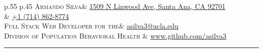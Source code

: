\documentclass{tccv}
\begin{document}
\begin{table}[htbp]
\begin{tabular}{ 
	p{}%
	p{}%
 }
	{\scshape\fontsize{20}{26}\mdseries\upshape Armando Silva}& \centering\arraybackslash \href{https://www.google.com/maps/place/1509+N+Linwood+Ave,+Santa+Ana,+CA+92701/@33.758298,-117.8506497,17z/data=!3m1!4b1!4m5!3m4!1s0x80dcd99c21dd18dd:0x4fe5fb4a40877585!8m2!3d33.758298!4d-117.848461}{1509 N Linwood Ave, Santa Ana, CA 92701} \\ 
	& \centering\arraybackslash \href{tel:17148628774}{+1 (714) 862-8774}        \\ 

	{\scshape\fontsize{10}{10}\mdseries\upshape Full Stack Web Developer for the}& \centering\arraybackslash \href{mailto:asilva3@ucla.edu}{asilva3@ucla.edu}         \\ 
	{\scshape\fontsize{10}{10}\mdseries\upshape Division of Population Behavioral Health}
	& \centering\arraybackslash \href{http://www.github.com/asilva3}{www.github.com/asilva3} \\

\end{tabular}
\end{table}
\hrule
\end{document}
